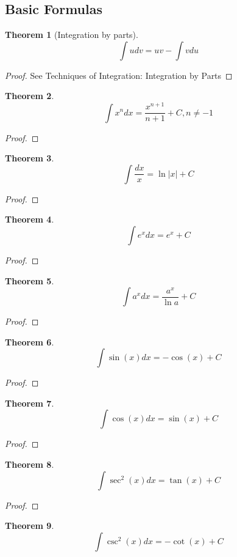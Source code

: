 \documentclass[10pt]{report}
\newtheorem{thm3}{Theorem}[subsection]
\begin{document}
\subsection{Basic Formulas}
\begin{thm3}[Integration by parts]
$$\int udv= uv - \int vdu$$
\end{thm3}
\begin{proof}
See Techniques of Integration: Integration by Parts
\end{proof}
\begin{thm3}
$$\int x^ndx=\frac{x^{n+1}}{n+1}+C, n\neq -1$$
\end{thm3}
\begin{proof}

\end{proof}
\begin{thm3}
$$\int \frac{dx}{x}=\ln|x|+C$$
\end{thm3}
\begin{proof}

\end{proof}
\begin{thm3}
$$\int e^xdx = e^x + C$$
\end{thm3}
\begin{proof}

\end{proof}
\begin{thm3}
$$\int a^xdx = \frac{a^x}{\ln a}+C$$
\end{thm3}
\begin{proof}

\end{proof}
\begin{thm3}
$$\int \sin(x) dx= -\cos(x) + C$$
\end{thm3}
\begin{proof}

\end{proof}
\begin{thm3}
$$\int \cos(x) dx= \sin(x) + C$$
\end{thm3}
\begin{proof}

\end{proof}
\begin{thm3}
$$\int \sec^2(x) dx=\tan(x) + C$$
\end{thm3}
\begin{proof}

\end{proof}
\begin{thm3}
$$\int \csc^2(x) dx= -\cot(x) + C$$
\end{thm3}
\end{document}

